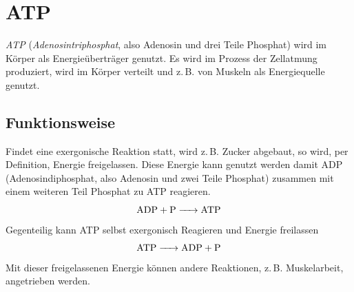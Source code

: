 \documentclass{article}
\begin{document}
\section{ATP}
\emph{ATP} (\emph{Adenosintriphosphat}, also Adenosin und drei Teile Phosphat) wird im Körper als Energieüberträger genutzt. Es wird im Prozess der Zellatmung produziert, wird im Körper verteilt und z.\,B. von Muskeln als Energiequelle genutzt. 
 
\subsection{Funktionsweise}
Findet eine exergonische Reaktion statt, wird z.\,B. Zucker abgebaut, so wird, per Definition, Energie freigelassen. Diese Energie kann genutzt werden damit ADP (Adenosindiphosphat, also Adenosin und zwei Teile Phosphat) zusammen mit einem weiteren Teil Phosphat zu ATP reagieren.
\[
 \ce{ADP + P -> ATP}
\]
Gegenteilig kann ATP selbst exergonisch Reagieren und Energie freilassen
\[
 \ce{ATP -> ADP + P} 
\]
Mit dieser freigelassenen Energie können andere Reaktionen, z.\,B. Muskelarbeit, angetrieben werden. 
\end{document}
